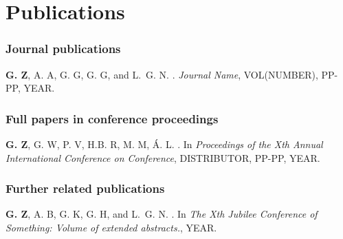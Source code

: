 \chapter*{Publications}

\vspace*{2em}

\subsection*{Journal publications}

\vspace*{1em}

\begin{enumerate}[wide = 0pt, widest = {[4]}, leftmargin =*]

\item[{[1]}] \textbf{G. Z}, A. A, G. G, G. G, and L.~G. N.
.
\newblock \emph{Journal Name}, VOL(NUMBER), PP-PP, YEAR.

\end{enumerate}

\subsection*{Full papers in conference proceedings}
\vspace*{1em}

\begin{enumerate}[wide = 0pt, widest = {[4]}, leftmargin =*]
\item[{[5]}] \textbf{G. Z}, G. W, P. V, H.B. R, M. M, Á. L.
.
\newblock In \emph{Proceedings of the Xth Annual International Conference on Conference}, DISTRIBUTOR, PP-PP, YEAR.
\end{enumerate}

\subsection*{Further related publications}
\vspace*{1em}

\begin{enumerate}[wide = 0pt, widest = {[15]}, leftmargin =*]

\item[{[8]}] \textbf{G. Z}, A. B, G. K, G. H, and L.~G. N.
.
\newblock In \emph{The Xth Jubilee Conference of Something: Volume of extended abstracts.}, YEAR.

\end{enumerate}